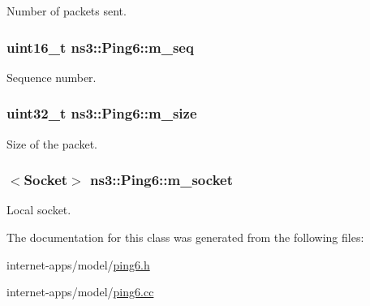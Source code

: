 Number of packets sent. 

\subsubsection[{\texorpdfstring{m\+\_\+seq}{m_seq}}]{\setlength{\rightskip}{0pt plus 5cm}uint16\+\_\+t ns3\+::\+Ping6\+::m\+\_\+seq\hspace{0.3cm}{\ttfamily [private]}}\hypertarget{classns3_1_1Ping6_a951109c23d5e308328e22f41ec2ce3de}{}\label{classns3_1_1Ping6_a951109c23d5e308328e22f41ec2ce3de}


Sequence number. 

\subsubsection[{\texorpdfstring{m\+\_\+size}{m_size}}]{\setlength{\rightskip}{0pt plus 5cm}uint32\+\_\+t ns3\+::\+Ping6\+::m\+\_\+size\hspace{0.3cm}{\ttfamily [private]}}\hypertarget{classns3_1_1Ping6_ad39776241ec4bf07226382aeeb53924a}{}\label{classns3_1_1Ping6_ad39776241ec4bf07226382aeeb53924a}


Size of the packet. 

\subsubsection[{\texorpdfstring{m\+\_\+socket}{m_socket}}]{$<${\bf Socket}$>$ ns3\+::\+Ping6\+::m\+\_\+socket\hspace{0.3cm}{\ttfamily [private]}}\hypertarget{classns3_1_1Ping6_a906684b14d88122f2a16b4a9d241194d}{}\label{classns3_1_1Ping6_a906684b14d88122f2a16b4a9d241194d}


Local socket. 



The documentation for this class was generated from the following files\+:\begin{DoxyCompactItemize}
\item 
internet-\/apps/model/\hyperlink{ping6_8h}{ping6.\+h}\item 
internet-\/apps/model/\hyperlink{ping6_8cc}{ping6.\+cc}\end{DoxyCompactItemize}
